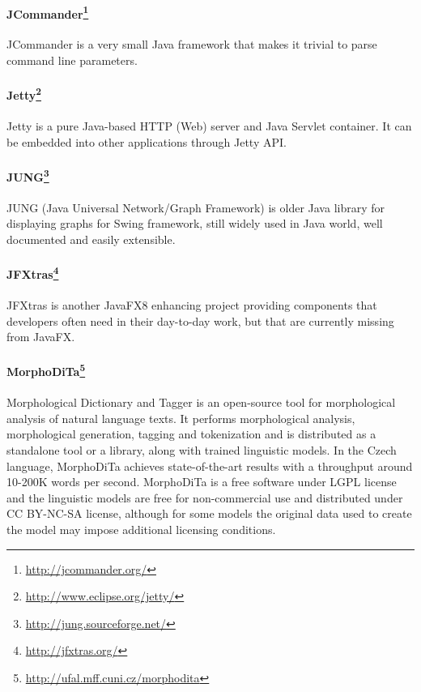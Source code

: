 \paragraph{JCommander\footnote{\url{http://jcommander.org/}}}
JCommander is a very small Java framework that makes it trivial to parse command
line parameters.

\paragraph{Jetty\footnote{\url{http://www.eclipse.org/jetty/}}}
Jetty is a pure Java-based HTTP (Web) server and Java Servlet container. It can
be embedded into other applications through Jetty API.

\paragraph{JUNG\footnote{\url{http://jung.sourceforge.net/}}}
JUNG (Java Universal Network/Graph Framework) is older Java library for
displaying graphs for Swing framework, still widely used in Java world, well documented and easily extensible.

\paragraph{JFXtras\footnote{\url{http://jfxtras.org/}}}
JFXtras is another JavaFX8 enhancing project providing components that
developers often need in their day-to-day work, but that are currently missing
from JavaFX.

\paragraph{MorphoDiTa\footnote{\url{http://ufal.mff.cuni.cz/morphodita}}}
Morphological Dictionary and Tagger is an open-source tool for morphological
analysis of natural language texts. It performs morphological analysis, 
morphological generation, tagging and tokenization and is distributed as
a standalone tool or a library, along with trained linguistic models. In
the Czech language, MorphoDiTa achieves state-of-the-art results with 
a throughput around 10-200K words per second. MorphoDiTa is a free software
under LGPL license and the linguistic models are free for non-commercial use
and distributed under CC BY-NC-SA license, although for some models the original
data used to create the model may impose additional licensing conditions.

